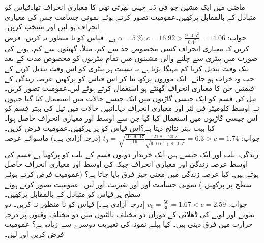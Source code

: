 \quad
ماضی میں ایک مشین جو فی ڈبہ  چینی بھرتی تھی کا معیاری انحراف  تھا۔قیاس  کو متبادل   کے بالمقابل پرکھیں۔عمومیت تصور کرتے ہوئے   نمونی جسامت   جس کی معیاری انحراف  ہو لیں اور 
 منتخب کریں۔\\
جواب:\quad
$\alpha=\SI{5}{\percent}, c=16.92>\tfrac{9\cdot 0.5^2}{0.4^2}=14.06$
 ہے۔ قیاس کو نا منظور نہ کریں۔
\quad
فرض کریں کہ معیاری انحراف کسی مخصوص حد سے کم، مثلاً،  گھنٹوں سے کم، ہونے کی صورت میں بیٹری سے چلنے والی مشینوں میں تمام بیٹریوں کو مخصوص مدت کے بعد بیک وقت تبدیل کرنا کم مہنگا پڑتا ہے  بہ نسبت ہر بیٹری کو اس وقت تبدیل کرنے کے جب وہ خراب ہو جائے۔ ایک موزوں پرکھ بنا کر اس قیاس کو پرکھیں۔عرصہ زندگی کے  قیمتیں جن کا معیاری انحراف  گھنٹے ہو استعمال کرتے ہوئے  لیں۔عمومیت تصور کریں۔
\quad
تیل کی قسم  کو  ایک جیسی گاڑیوں میں ایک جیسے حالات میں استعمال کیا گیا جنہوں نے اوسط  کلومیٹر فی لٹر اور معیاری انحراف  دیا۔انہیں حالات میں تیل کی بہتر قسم  کو اس جیسی  گاڑیوں میں استعمال کیا گیا جن سے اوسط  اور معیاری انحراف  حاصل ہوا۔کیا  بہت بہتر نتائج دیتا ہے؟اس قیاس کو  پر پرکھیں۔عمومیت فرض کریں۔\\
جواب:\quad
$t_0=\sqrt{\tfrac{10\cdot9\cdot17}{19}}\tfrac{21.8-20.2}{\sqrt{9\cdot 0.6^2+8\cdot0.5^2}}=6.3>c=1.74$
(درجہ آزادی  ہے۔)
\quad
ماسوائے عرصہ زندگی، بلب  اور   ایک جیسے ہیں۔ایک خریدار دونوں قسم کے  بلب کو پرکھتا ہے۔قسم  کی  اوسط عرصہ زندگی  اور معیاری انحراف  جبکہ  کی اوسط  اور معیاری انحراف  حاصل ہوتے ہیں۔ کیا عرصہ زندگی میں معنی خیز فرق پایا جاتا ہے؟ (عمومیت فرض کرتے ہوئے  سطح پر پرکھیں۔)
\quad
نمونی جسامت  اور  اور تغیریت  اور  لیں۔ عمومیت تصور کرتے ہوئے  سطح پر  قیاس  کو متبادل  کے بالمقابل پرکھیں۔\\
جواب:\quad
$v_0=\tfrac{50}{30}=1.67<c=2.59$
[درجہ آزادی  ہے۔] قیاس کو نا منظور نہ کریں۔
\quad
دو نمونے  اور  لوہے کی ڈھلائی کے دوران دو مختلف بالٹیوں میں دو مختلف وقتوں پر درجہ حرارت  میں فرق دیتی ہیں۔ کیا پہلے نمونہ کی تغیریت دوسرے  سے زیادہ ہے؟ عمومیت فرض کریں اور  لیں۔


